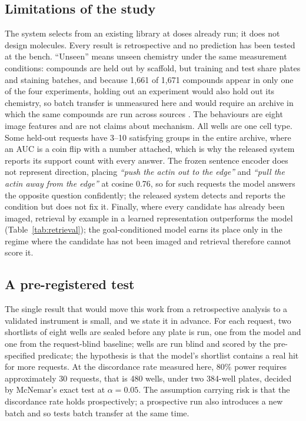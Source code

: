 \documentclass[11pt]{article}
\newcommand{\goal}[1]{\textit{``#1''}}
\begin{document}
\subsection*{Limitations of the study}

The system selects from an existing library at doses already run; it does not design
molecules. Every result is retrospective and no prediction has been tested at the bench.
``Unseen'' means unseen chemistry under the same measurement conditions: compounds are held
out by scaffold, but training and test share plates and staining batches, and because 1,661
of 1,671 compounds appear in only one of the four experiments, holding out an experiment
would also hold out its chemistry, so batch transfer is unmeasured here and would require an
archive in which the same compounds are run across sources
\citep{chandrasekaran2023jump}. The behaviours are eight image features and are not claims
about mechanism. All wells are one cell type. Some held-out requests have 3--10 satisfying
groups in the entire archive, where an AUC is a coin flip with a number attached, which is
why the released system reports its support count with every answer. The frozen sentence
encoder does not represent direction, placing \goal{push the actin out to the edge} and
\goal{pull the actin away from the edge} at cosine 0.76, so for such requests the model
answers the opposite question confidently; the released system detects and reports the
condition but does not fix it. Finally, where every candidate has already been imaged,
retrieval by example in a learned representation outperforms the model
(Table~\ref{tab:retrieval}); the goal-conditioned model earns its place only in the regime
where the candidate has not been imaged and retrieval therefore cannot score it.

\subsection*{A pre-registered test}

The single result that would move this work from a retrospective analysis to a validated
instrument is small, and we state it in advance. For each request, two shortlists of eight
wells are sealed before any plate is run, one from the model and one from the request-blind
baseline; wells are run blind and scored by the pre-specified predicate; the hypothesis is
that the model's shortlist contains a real hit for more requests. At the discordance rate
measured here, 80\% power requires approximately 30 requests, that is 480 wells, under two
384-well plates, decided by McNemar's exact test at $\alpha = 0.05$. The assumption carrying
risk is that the discordance rate holds prospectively; a prospective run also introduces a
new batch and so tests batch transfer at the same time.
\end{document}
